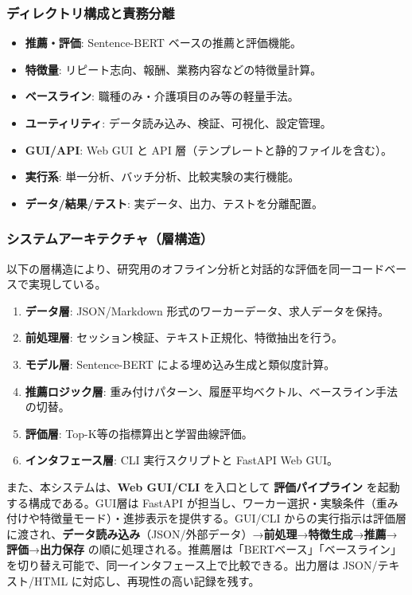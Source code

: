 \subsubsection*{ディレクトリ構成と責務分離}
\begin{itemize}
	\item \textbf{推薦・評価}: Sentence-BERT ベースの推薦と評価機能。
	\item \textbf{特徴量}: リピート志向、報酬、業務内容などの特徴量計算。
	\item \textbf{ベースライン}: 職種のみ・介護項目のみ等の軽量手法。
	\item \textbf{ユーティリティ}: データ読み込み、検証、可視化、設定管理。
	\item \textbf{GUI/API}: Web GUI と API 層（テンプレートと静的ファイルを含む）。
	\item \textbf{実行系}: 単一分析、バッチ分析、比較実験の実行機能。
	\item \textbf{データ/結果/テスト}: 実データ、出力、テストを分離配置。
\end{itemize}

\subsubsection*{システムアーキテクチャ（層構造）}
以下の層構造により、研究用のオフライン分析と対話的な評価を同一コードベースで実現している。
\begin{enumerate}
	\item \textbf{データ層}: JSON/Markdown 形式のワーカーデータ、求人データを保持。
	\item \textbf{前処理層}: セッション検証、テキスト正規化、特徴抽出を行う。
	\item \textbf{モデル層}: Sentence-BERT による埋め込み生成と類似度計算。
	\item \textbf{推薦ロジック層}: 重み付けパターン、履歴平均ベクトル、ベースライン手法の切替。
	\item \textbf{評価層}: Top-K等の指標算出と学習曲線評価。
	\item \textbf{インタフェース層}: CLI 実行スクリプトと FastAPI Web GUI。
\end{enumerate}
また、本システムは、\textbf{Web GUI/CLI} を入口として \textbf{評価パイプライン} を起動する構成である。GUI層は FastAPI が担当し、ワーカー選択・実験条件（重み付けや特徴量モード）・進捗表示を提供する。GUI/CLI からの実行指示は評価層に渡され、\textbf{データ読み込み}（JSON/外部データ）→\textbf{前処理}→\textbf{特徴生成}→\textbf{推薦}→\textbf{評価}→\textbf{出力保存} の順に処理される。推薦層は「BERTベース」「ベースライン」を切り替え可能で、同一インタフェース上で比較できる。出力層は JSON/テキスト/HTML に対応し、再現性の高い記録を残す。

